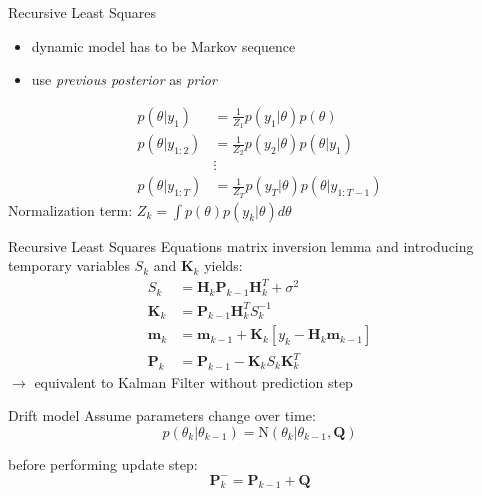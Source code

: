 \documentclass[navbarinfooter, 12pt]{sdqbeamer}
\begin{document}
\begin{frame}{Recursive Least Squares}
  \begin{itemize}
    \item dynamic model has to be Markov sequence
    \item  use \textit{previous posterior} as \textit{prior}
  \end{itemize}
  \begin{align*}
      p(\theta | y_{1}) &= \frac{1}{Z_1} p(y_1 | \theta) p(\theta) \\
      p(\theta | y_{1:2}) &= \frac{1}{Z_2} p(y_2 | \theta) p(\theta | y_1) \\
                        &\vdots \\
    p(\theta | y_{1:T}) &= \frac{1}{Z_T} p(y_T | \theta) p(\theta | y_{1:T-1})                \end{align*}
  Normalization term: $Z_k = \int p(\theta) p(y_k | \theta) d\theta$ %
\end{frame}

\begin{frame}{Recursive Least Squares Equations}
  matrix inversion lemma and introducing \\
  temporary variables $S_k$ and $\textbf{K}_k$ yields:
   \begin{align*}
     S_k &= \textbf{H}_k \textbf{P}_{k-1} \textbf{H}^T_k + \sigma^2 \\
     \textbf{K}_k &= \textbf{P}_{k-1} \textbf{H}^T_k S_k^{-1} \\
     \textbf{m}_k &= \textbf{m}_{k-1} + \textbf{K}_k [y_k - \textbf{H}_k \textbf{m}_{k-1}] \\
     \textbf{P}_k &= \textbf{P}_{k-1} - \textbf{K}_k S_k \textbf{K}_k^T
   \end{align*}
  $\rightarrow$ equivalent to Kalman Filter without prediction step
\end{frame}

\begin{frame}{Drift model}
  Assume parameters change over time:
  $$ p(\theta_k | \theta_{k-1}) = \text{N}(\theta_k | \theta_{k-1}, \textbf{Q}) $$ 
  
  before performing update step:
  $$ \textbf{P}^-_k = \textbf{P}_{k-1} + \textbf{Q} $$
\end{frame}
\end{document}
